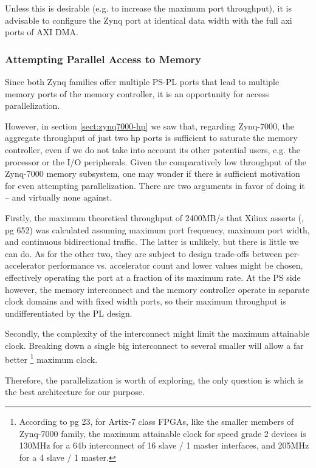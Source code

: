 Unless this is desirable (e.g. to increase the maximum port throughput),
it is advisable to configure the Zynq port at identical data width with the
full \gls{axi} ports of AXI DMA.

\subsubsection{Attempting Parallel Access to Memory}

Since both Zynq families offer multiple PS-PL ports that lead to
multiple memory ports of the memory controller,
it is an opportunity for access parallelization.

However, in section \ref{sect:zynq7000-hp}
we saw that, regarding Zynq-7000,
the aggregate throughput of just two \gls{hp} ports
is sufficient to saturate the memory controller,
even if we do not take into account its other potential users,
e.g. the processor or the I/O peripherals.
Given the comparatively low throughput of the Zynq-7000 memory subsystem,
one may wonder if there is sufficient motivation for even attempting parallelization.
There are two arguments in favor of doing it -- and virtually none against.

Firstly, the maximum theoretical throughput of 2400MB/s that Xilinx asserts (\cite{ug585}, pg 652)
was calculated assuming maximum port frequency, maximum port width, and continuous bidirectional
traffic. The latter is unlikely, but there is little we can do. As for the other two,
they are subject to design trade-offs between per-accelerator performance vs. accelerator count
and lower values might be chosen, effectively operating the port at a fraction of its
maximum rate. At the PS side however, the memory interconnect and the memory controller
operate in separate clock domains and with fixed width ports,
so their maximum throughput is undifferentiated by the PL design.

Secondly, the complexity of the interconnect might limit the maximum attainable clock.
Breaking down a single big interconnect to several smaller will allow a far better
	\footnote{
		According to \cite{pg059} pg 23, for Artix-7 class FPGAs,
		like the smaller members of Zynq-7000 family, the maximum attainable
		clock for speed grade 2 devices is 130MHz for a 64b interconnect of
		16 slave / 1 master interfaces, and 205MHz for a 4 slave / 1 master.
	}
maximum clock.

Therefore, the parallelization is worth of exploring, the only question is
which is the best architecture for our purpose.

